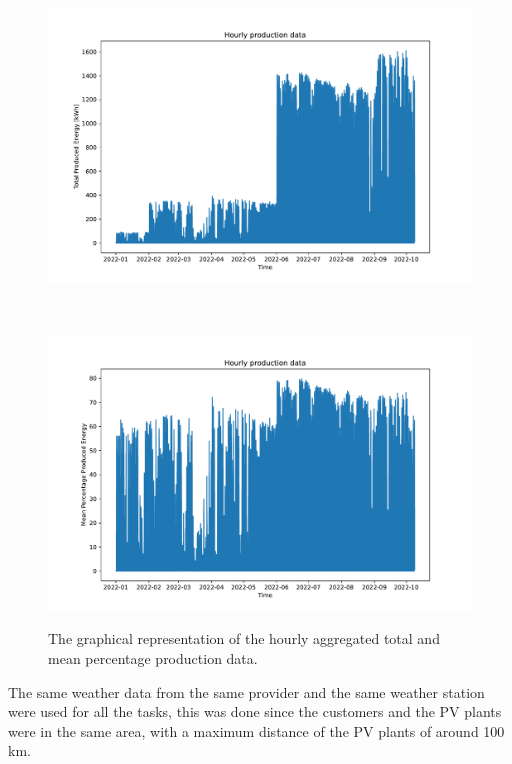 \begin{figure}[H]
\begin{minipage}[b]{8.5cm}
\centering
\includegraphics[width=1\textwidth]{images/production/data_plot}
\subcaption{}
\label{fig:productiondataplot}
\end{minipage}
\ \hspace{2mm} \
\begin{minipage}[b]{8.5cm}
\centering
\includegraphics[width=1\textwidth]{images/production/data_plot_percentage}
\subcaption{}
\label{fig:productiondataplotpercentage}
\end{minipage}
\caption{The graphical representation of the hourly aggregated  total and  mean percentage production data.}
\end{figure}

The same weather data from the same provider and the same weather station were used for all the tasks, this was done since the customers and the PV plants were in the same area, with a maximum distance of the PV plants of around 100 km.



